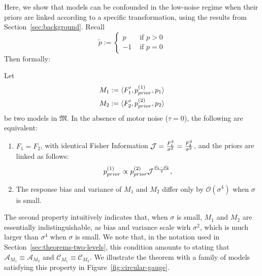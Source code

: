 Here, we show that models can be confounded in the low-noise regime when their priors are linked according to a specific transformation, using the results from Section~\ref{sec:background}.
Recall
\begin{equation}\label{eq:tilde-p-also2}
    \tilde{p} := \begin{cases} p &\text{ if } p > 0 \\ -1 & \text{ if } p=0\end{cases}
\end{equation}
Then formally:
\begin{thm}
Let 
\begin{align*}
    M_1 := \langle F'_1, p_{prior}^{(1)}, p_1 \rangle \\
    M_2 := \langle F'_2, p_{prior}^{(2)}, p_2 \rangle 
\end{align*}
be two models in $\mathfrak{M}$. In the absence of motor noise ($\tau=0$), the following are equivalent:
\begin{enumerate}
    \item $F_1 = F_2$, with identical Fisher Information $\mathcal{J} = \frac{F_1^2}{\sigma^2} = \frac{F_2^2}{\sigma^2}$, and the priors are linked as follows:
\begin{equation}\label{eq:prior-transformation}
    p_{prior}^{(1)} \propto p_{prior}^{(2)}  \mathcal{J}^{\frac{\tilde{p_1}-\tilde{p_2}}{4}},
\end{equation}
\item The response bias and variance of $M_1$ and $M_2$ differ only by $\mathcal{O}(\sigma^4)$ when $\sigma$ is small.
\end{enumerate}
\end{thm}
The second property intuitively indicates that, when $\sigma$ is small, $M_1$ and $M_2$ are essentially indistinguishable, as bias and variance scale wirh $\sigma^2$, which is much larger than $\sigma^4$ when $\sigma$ is small. We note that, in the notation used in Section~\ref{sec:theorems-two-levels}, this condition amounts to stating that $\mathcal{A}_{M_1} \equiv \mathcal{A}_{M_2}$ and $\mathcal{C}_{M_1} \equiv \mathcal{C}_{M_2}$.
We illustrate the theorem with a family of models satisfying this property in Figure~\ref{fig:circular-gauge}.
